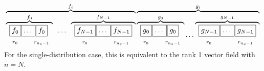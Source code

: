 \[
\overbrace{
\overbrace{
\begin{array}{cc} \boxed{f_0} \\  _{r_0} \end{array} \mkern-18mu
\begin{array}{cc} \boxed{\ldots\vphantom{f_0}} \\ \phantom{r_2}\end{array} \mkern-22mu
\begin{array}{cc} \boxed{f_0} \\  _{r_{n_s-1}} \end{array}
}^{f_0}
\begin{array}{cc} \ldots \\ \phantom{r_2} \end{array}
\overbrace{
\begin{array}{cc} \boxed{f_{N-1}} \\  _{r_0} \end{array} \mkern-17mu
\begin{array}{cc} \boxed{\ldots\vphantom{f_{N-1}}} \\ \phantom{r_2}\end{array} \mkern-17mu
\begin{array}{cc} \boxed{f_{N-1}} \\  _{r_{n_s-1}} \end{array}
}^{f_{N-1}}
}^{f_i}
\overbrace{
\overbrace{
\begin{array}{cc} \boxed{g_0\vphantom{f_{N-1}}} \\ _{r_0} \end{array} \mkern-17mu
\begin{array}{cc} \boxed{\ldots\vphantom{f_{N-1}}} \\ \phantom{r_2}\end{array} \mkern-22mu
\begin{array}{cc} \boxed{g_0\vphantom{f_{N-1}}} \\  _{r_{n_s-1}} \end{array}
}^{g_0} \ldots
\overbrace{
\begin{array}{cc} \boxed{g_{N-1}\vphantom{f_{N-1}}} \\ _{r_0} \end{array} \mkern-17mu
\begin{array}{cc} \boxed{\ldots\vphantom{f_{N-1}}} \\ \phantom{r_2}\end{array} \mkern-17mu
\begin{array}{cc} \boxed{g_{N-1}\vphantom{f_{N-1}}} \\  _{r_{n_s-1}} \end{array}
}^{g_{N-1}\vphantom{f_{N-1}}}
}^{g_i} 
\]
For the single-distribution case, this is equivalent to the rank 1 vector
field with $n=N$.

